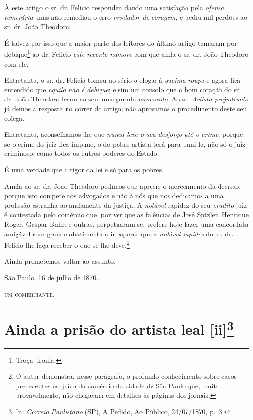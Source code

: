 À este artigo o sr. dr. Felicio respondeu dando uma satisfação pela
\emph{ofensa temerária}; mas não remediou o erro \emph{revelador de
coragem}, e pediu mil perdões ao sr. dr. João Theodoro.

É talvez por isso que a maior parte dos leitores do último artigo
tomaram por debique\footnote{ Troça, ironia.} ao dr. Felicio \emph{este
recente namoro} com que anda o sr. dr. João Theodoro com ele.

Entretanto, o sr. dr. Felicio tomou ao sério o elogio à
\emph{queima-roupa} e agora fica entendido que \emph{aquilo não é
debique}; e sim um consolo que o bom coração do sr. dr. João Theodoro
levou ao seu amargurado \emph{namorado}. Ao sr. \emph{Artista
prejudicado} já demos a resposta no correr do artigo; não aprovamos o
procedimento deste seu colega.

Entretanto, aconselhamos-lhe que \emph{nunca leve o seu desforço até o
crime}, porque se o crime do juiz fica impune, o do pobre artista terá
para puni-lo, não só o juiz criminoso, como todos os outros poderes do
Estado.

É uma verdade que o rigor da lei é só para os pobres.

Ainda ao sr. dr. João Theodoro pedimos que aprecie o merecimento da
decisão, porque isto compete aos advogados e não à nós que nos dedicamos
a uma profissão estranha ao andamento da justiça. A \emph{notável}
rapidez do seu \emph{erudito} juiz é contestada pelo comércio que, por
ver que as falências de José Sptzler, Henrique Roger, Gaspar Buhr, e
outras, perpetuaram-se, prefere hoje fazer uma concordata amigável com
grande abatimento a ir esperar que a \emph{notável rapidez} do sr. dr.
Felicio lhe faça receber o que se lhe deve.\footnote{ O autor
  demonstra, nesse parágrafo, o profundo conhecimento sobre casos
  precedentes no juízo do comércio da cidade de São Paulo que, muito
  provavelmente, não chegavam em detalhes às páginas dos jornais.}

Ainda prometemos voltar ao assunto.
\begin{flushright}
São Paulo, 16 de julho de 1870.

\textsc{um comerciante}.
\end{flushright}
\chapter{Ainda a prisão do artista leal {[}ii{]}\footnote{ In: \emph{Correio Paulistano} (SP), A Pedido, Ao Público,
  24/07/1870, p.~3.}} %

